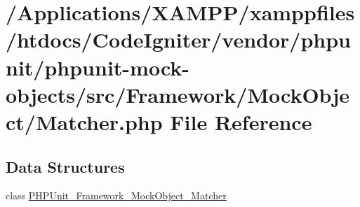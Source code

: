 \hypertarget{phpunit_2phpunit-mock-objects_2src_2_framework_2_mock_object_2_matcher_8php}{}\section{/\+Applications/\+X\+A\+M\+P\+P/xamppfiles/htdocs/\+Code\+Igniter/vendor/phpunit/phpunit-\/mock-\/objects/src/\+Framework/\+Mock\+Object/\+Matcher.php File Reference}
\label{phpunit_2phpunit-mock-objects_2src_2_framework_2_mock_object_2_matcher_8php}
\subsection*{Data Structures}
\begin{DoxyCompactItemize}
\item 
class \mbox{\hyperlink{class_p_h_p_unit___framework___mock_object___matcher}{P\+H\+P\+Unit\+\_\+\+Framework\+\_\+\+Mock\+Object\+\_\+\+Matcher}}
\end{DoxyCompactItemize}
